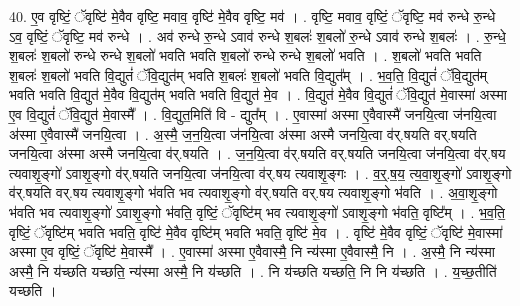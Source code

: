 \documentclass[17pt]{extarticle}
\begin{document}
40. ए॒व वृष्टिं॒ ॅवृष्टि॑ मे॒वैव वृष्टि॒ मवाव॒ वृष्टि॑ मे॒वैव वृष्टि॒ मव॑ । . वृष्टि॒ मवाव॒ वृष्टिं॒ ॅवृष्टि॒ मव॑ रुन्धे रु॒न्धे ऽव॒ वृष्टिं॒ ॅवृष्टि॒ मव॑ रुन्धे । . अव॑ रुन्धे रु॒न्धे ऽवाव॑ रुन्धे श॒बलः॑ श॒बलो॑ रु॒न्धे ऽवाव॑ रुन्धे श॒बलः॑ । . रु॒न्धे॒ श॒बलः॑ श॒बलो॑ रुन्धे रुन्धे श॒बलो॑ भवति भवति श॒बलो॑ रुन्धे रुन्धे श॒बलो॑ भवति । . श॒बलो॑ भवति भवति श॒बलः॑ श॒बलो॑ भवति वि॒द्युतं॑ ॅवि॒द्युत॑म् भवति श॒बलः॑ श॒बलो॑ भवति वि॒द्युत᳚म् । . भ॒व॒ति॒ वि॒द्युतं॑ ॅवि॒द्युत॑म् भवति भवति वि॒द्युत॑ मे॒वैव वि॒द्युत॑म् भवति भवति वि॒द्युत॑ मे॒व । . वि॒द्युत॑ मे॒वैव वि॒द्युतं॑ ॅवि॒द्युत॑ मे॒वास्मा॑ अस्मा ए॒व वि॒द्युतं॑ ॅवि॒द्युत॑ मे॒वास्मै᳚ । . वि॒द्युत॒मिति॑ वि - द्युत᳚म् । . ए॒वास्मा॑ अस्मा ए॒वैवास्मै॑ जनयि॒त्वा ज॑नयि॒त्वा अ॑स्मा ए॒वैवास्मै॑ जनयि॒त्वा । . अ॒स्मै॒ ज॒न॒यि॒त्वा ज॑नयि॒त्वा अ॑स्मा अस्मै जनयि॒त्वा व॑र्.षयति वर्.षयति जनयि॒त्वा अ॑स्मा अस्मै जनयि॒त्वा व॑र्.षयति । . ज॒न॒यि॒त्वा व॑र्.षयति वर्.षयति जनयि॒त्वा ज॑नयि॒त्वा व॑र्.षय त्यवाशृ॒ङ्गो॑ ऽवाशृ॒ङ्गो व॑र्.षयति जनयि॒त्वा ज॑नयि॒त्वा व॑र्.षय त्यवाशृ॒ङ्गः । . व॒र्॒.ष॒य॒ त्य॒वा॒शृ॒ङ्गो॑ ऽवाशृ॒ङ्गो व॑र्.षयति वर्.षय त्यवाशृ॒ङ्गो भ॑वति भव त्यवाशृ॒ङ्गो व॑र्.षयति वर्.षय त्यवाशृ॒ङ्गो भ॑वति । . अ॒वा॒शृ॒ङ्गो भ॑वति भव त्यवाशृ॒ङ्गो॑ ऽवाशृ॒ङ्गो भ॑वति॒ वृष्टिं॒ ॅवृष्टि॑म् भव त्यवाशृ॒ङ्गो॑ ऽवाशृ॒ङ्गो भ॑वति॒ वृष्टि᳚म् । . भ॒व॒ति॒ वृष्टिं॒ ॅवृष्टि॑म् भवति भवति॒ वृष्टि॑ मे॒वैव वृष्टि॑म् भवति भवति॒ वृष्टि॑ मे॒व । . वृष्टि॑ मे॒वैव वृष्टिं॒ ॅवृष्टि॑ मे॒वास्मा॑ अस्मा ए॒व वृष्टिं॒ ॅवृष्टि॑ मे॒वास्मै᳚ । . ए॒वास्मा॑ अस्मा ए॒वैवास्मै॒ नि न्य॑स्मा ए॒वैवास्मै॒ नि । . अ॒स्मै॒ नि न्य॑स्मा अस्मै॒ नि य॑च्छति यच्छति॒ न्य॑स्मा अस्मै॒ नि य॑च्छति । . नि य॑च्छति यच्छति॒ नि नि य॑च्छति । . य॒च्छ॒तीति॑ यच्छति । \newline
\pagebreak
{}
\end{document}
